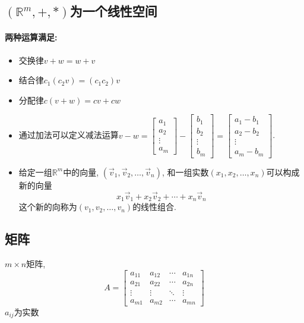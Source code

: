 \subsection{$\left( \mathbb{R}^m, +, * \right) $为一个线性空间}
\paragraph{两种运算满足:}
\begin{itemize}
    \item 交换律$v+w=w+v$
    \item 结合律$c_1(c_2v)=(c_1c_2)v$
    \item 分配律$c(v+w)=cv+cw$
    \item 通过加法可以定义减法运算$v-w=\begin{bmatrix} a_1 \\ a_2 \\ \vdots \\ a_m \end{bmatrix}-\begin{bmatrix} b_1 \\ b_2 \\ \vdots \\ b_m \end{bmatrix}=\begin{bmatrix} a_1-b_1 \\ a_2-b_2 \\ \vdots \\ a_m-b_m \end{bmatrix}$.
    \item 给定一组$\mathbb{R}^m$中的向量, $\left( \vec{v}_1, \vec{v}_2, \ldots ,\vec{v}_n \right) $, 和一组实数$(x_1,x_2,\ldots ,x_n)$可以构成新的向量
    \begin{equation}
  x_1 \vec{v}_1 +x_2 \vec{v}_2+ \cdots +x_n \vec{v}_n
\end{equation}
这个新的向称为$\left( v_1, v_2, \ldots ,v_n \right) $的线性组合.
\end{itemize}

\subsection{矩阵}
\begin{definition}
    $m\times n$矩阵, 
    \begin{equation}
      A = \begin{bmatrix}
          a_{11} & a_{12} & \cdots & a_{1n} \\
          a_{21} & a_{22} & \cdots & a_{2n} \\
          \vdots & \vdots & \ddots & \vdots \\
          a_{m1} & a_{m2} & \cdots & a_{mn}
      \end{bmatrix}
    \end{equation}
    $a_{ij}$为实数
\end{definition}

